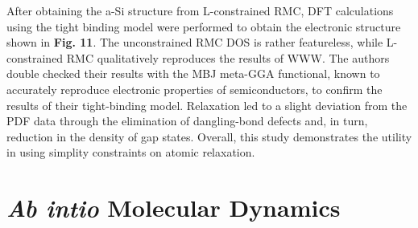 \documentclass[3p,review,12pt]{elsarticle}
\begin{document}
\par 
After obtaining the a-Si structure from L-constrained RMC, DFT calculations using the tight binding model were performed to obtain the electronic structure shown in \textbf{Fig. 11}. The unconstrained RMC DOS is rather featureless, while L-constrained RMC qualitatively reproduces the results of WWW. The authors double checked their results with the MBJ meta-GGA functional, known to accurately reproduce electronic properties of semiconductors, to confirm the results of their tight-binding model. Relaxation led to a slight deviation from the PDF data through the elimination of dangling-bond defects and, in turn, reduction in the density of gap states. Overall, this study demonstrates the utility in using simplity constraints on atomic relaxation.


















\section{\emph{Ab intio} Molecular Dynamics}
\end{document}
